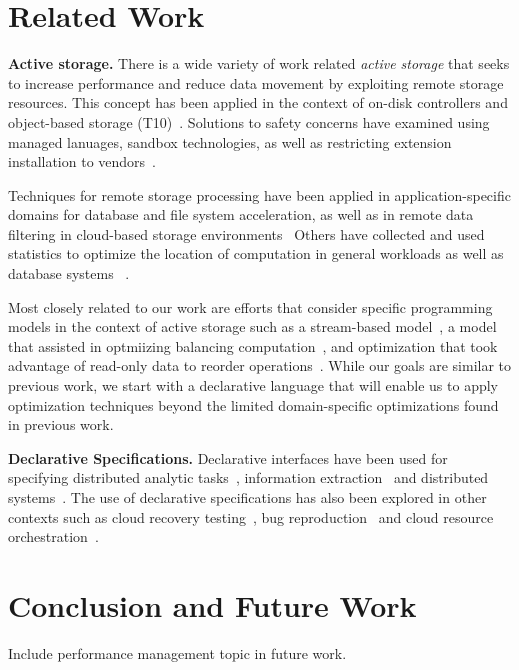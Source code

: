 \documentclass[10pt,twocolumn]{article}
\begin{document}
\section{Related Work}

{\bf Active storage.}
There is a wide variety of work related \emph{active storage} that seeks to
increase performance and reduce data movement by exploiting remote storage
resources. This concept has been applied in the context of on-disk
controllers and object-based storage
(T10)~\cite{riedel:vldb98,du:nwesp05,xie:msst11}.  Solutions to safety
concerns have examined using managed lanuages, sandbox technologies, as well
as restricting extension installation to
vendors~\cite{john:hiperio08,xie:msst11,runde:msst12}.

Techniques for remote storage processing have been applied in
application-specific domains for database and file system acceleration, as
well as in remote data filtering in cloud-based storage
environments~\cite{uysal:hpca00,chiu:iccs03,lim:msst08,gkantsidis:nsdi13}
Others have collected and used statistics to optimize the location of
computation in general workloads as well as database systems
~\cite{chen:cluster12,chen:icpp12,qiao:icde08}.

Most closely related to our work are efforts that consider specific
programming models in the context of active storage such as a stream-based
model~\cite{acharya:asplos98}, a model that assisted in optmiizing balancing
computation~\cite{wickremesinghe:hpdc022}, and optimization that took
advantage of read-only data to reorder operations~\cite{huston:fast04}.
While our goals are similar to previous work, we start with a declarative
language that will enable us to apply optimization techniques beyond
the limited domain-specific optimizations found in previous work.

{\bf Declarative Specifications.}
Declarative interfaces have been used for specifying distributed analytic 
tasks~\cite{olston_pig_2008,thusoo_hive_2010}, information 
extraction~\cite{shen_declarative_2007} and distributed 
systems~\cite{conway_logic_2012,bauer_legion_2014}. The use of declarative 
specifications has also been explored in other contexts such as cloud recovery 
testing~\cite{gunawi_fate_2011}, bug reproduction~\cite{li_reprolite_2014} and 
cloud resource orchestration~\cite{liu_declarative_2011}.

\section{Conclusion and Future Work}

Include performance management topic in future work.



\end{document}
